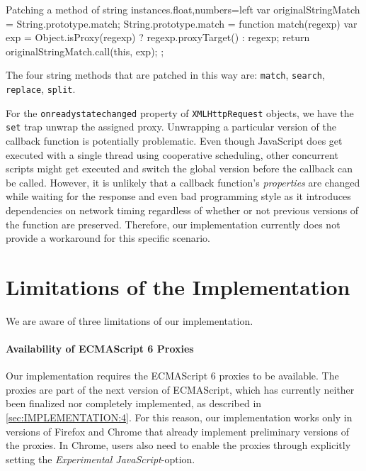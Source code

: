 \begin{code}{Patching a method of string instances.}{float,numbers=left}
var originalStringMatch = String.prototype.match;
String.prototype.match = function match(regexp) {
    var exp = Object.isProxy(regexp) ?
        regexp.proxyTarget() : regexp;
    return originalStringMatch.call(this, exp);
};
\end{code}
\iffalse
\end{verbatim}\fi

The four string methods that are patched in this way are: \lstinline{match}, \lstinline{search}, \lstinline{replace}, \lstinline{split}.

For the \lstinline{onreadystatechanged} property of \lstinline{XMLHttpRequest} objects, we have the \lstinline{set} trap unwrap the assigned proxy.
Unwrapping a particular version of the callback function is potentially problematic.
Even though JavaScript does get executed with a single thread using cooperative scheduling, other concurrent scripts might get executed and switch the global version before the callback can be called.
However, it is unlikely that a callback function's \emph{properties} are changed while waiting for the response and even bad programming style as it introduces dependencies on network timing regardless of whether or not previous versions of the function are preserved.
Therefore, our implementation currently does not provide a workaround for this specific scenario. 





\section{Limitations of the Implementation}

We are aware of three limitations of our implementation.

\paragraph{Availability of ECMAScript 6 Proxies}
Our implementation requires the ECMAScript 6 proxies to be available.
The proxies are part of the next version of ECMAScript, which has currently neither been finalized nor completely implemented, as described in \ref{sec:IMPLEMENTATION:4}.
For this reason, our implementation works only in versions of Firefox and Chrome that already implement preliminary versions of the proxies.
In Chrome, users also need to enable the proxies through explicitly setting the \emph{Experimental JavaScript}-option.

